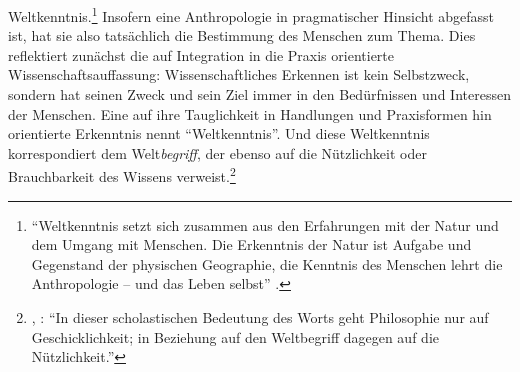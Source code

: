 Weltkenntnis.\footnote{\enquote{Weltkenntnis setzt sich zusammen aus den
Erfahrungen mit der Natur und dem Umgang mit Menschen. Die Erkenntnis der
Natur ist Aufgabe und Gegenstand der physischen Geographie, die Kenntnis des
Menschen lehrt die Anthropologie -- und das Leben selbst}
\parencite[][185]{Boehr:PhilosophiefuerdieWelt2003}.} Insofern eine
Anthropologie in pragmatischer Hinsicht abgefasst ist, hat sie also tatsächlich
die Bestimmung des Menschen zum Thema. Dies reflektiert zunächst die auf
Integration in die Praxis orientierte Wissenschaftsauffassung:
Wissenschaftliches Erkennen ist kein Selbstzweck, sondern hat seinen Zweck und
sein Ziel immer in den Bedürfnissen und Interessen der Menschen. Eine auf ihre
Tauglichkeit in Handlungen und Praxisformen hin orientierte Erkenntnis nennt
 \enquote{Weltkenntnis}. Und diese Weltkenntnis
korrespondiert dem Welt\emph{begriff}, der ebenso auf die Nützlichkeit oder
Brauchbarkeit des Wissens
verweist.\footnote{\cite[Vgl.][A~23]{Kant:ImmanuelKantsLogik1977}, \cite[IX:
24.6--8]{Kant:GesammelteWerke1900ff.}: \enquote{In dieser scholastischen
Bedeutung des Worts geht Philosophie nur auf Geschicklichkeit; in Beziehung auf
den Weltbegriff dagegen auf die Nützlichkeit.}}

